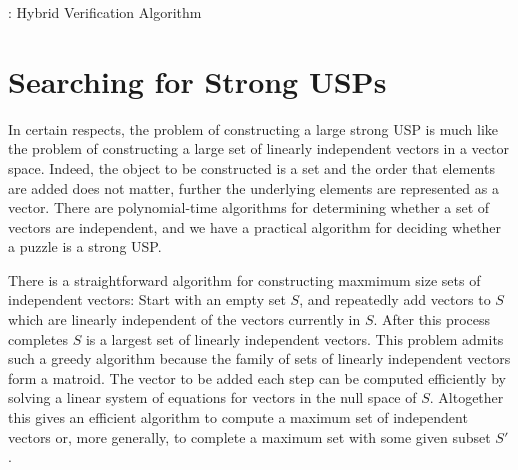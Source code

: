\documentclass[11pt]{article}
\begin{document}
\begin{algorithm}
  \caption{: Hybrid Verification Algorithm}
  \label{alg:hybrid}
\begin{algorithmic}[1]
    \EndIf
    \EndIf
    \EndIf
  \EndFunction
\end{algorithmic}
\end{algorithm}

\section{Searching for Strong USPs}
\label{sec:search}

In certain respects, the problem of constructing a large strong USP is
much like the problem of constructing a large set of linearly
independent vectors in a vector space.  Indeed, the object to be
constructed is a set and the order that elements are added does not
matter, further the underlying elements are represented as a vector.
There are polynomial-time algorithms for determining whether a set of
vectors are independent, and we have a practical algorithm for
deciding whether a puzzle is a strong USP.

There is a straightforward algorithm for constructing maxmimum size
sets of independent vectors: Start with an empty set $S$, and
repeatedly add vectors to $S$ which are linearly independent of the
vectors currently in $S$.  After this process completes $S$ is a
largest set of linearly independent vectors.  This problem admits such
a greedy algorithm because the family of sets of linearly independent
vectors form a matroid.  The vector to be added each step can be
computed efficiently by solving a linear system of equations for
vectors in the null space of $S$.  Altogether this gives an efficient
algorithm to compute a maximum set of independent vectors or, more
generally, to complete a maximum set with some given subset $S'$.
\end{document}
